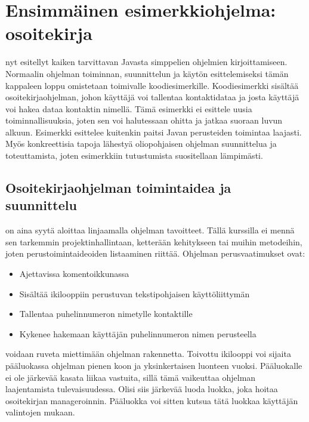 \documentclass{tufte-book}
\begin{document}

\section{Ensimmäinen esimerkkiohjelma: osoitekirja}
\label{osoitekirja}

 nyt esitellyt kaiken tarvittavan Javasta simppelien ohjelmien
kirjoittamiseen. Normaalin ohjelman toiminnan, suunnittelun ja käytön esittelemiseksi tämän
kappaleen loppu omistetaan toimivalle koodiesimerkille. Koodiesimerkki sisältää
osoitekirjaohjelman, johon käyttäjä voi tallentaa kontaktidataa ja josta käyttäjä voi hakea dataa
kontaktin nimellä. Tämä esimerkki ei esittele uusia toiminnallisuuksia, joten sen voi halutessaan
ohitta ja jatkaa suoraan luvun  alkuun. Esimerkki esittelee kuitenkin paitsi
Javan perusteiden toimintaa laajasti. Myös konkreettisia tapoja lähestyä oliopohjaisen ohjelman
suunnittelua ja toteuttamista, joten esimerkkiin tutustumista suositellaan lämpimästi.

\subsection{Osoitekirjaohjelman toimintaidea ja suunnittelu}
\label{osoitekirja suunnittelu}

 on aina syytä aloittaa linjaamalla ohjelman tavoitteet. Tällä
kurssilla ei mennä sen tarkemmin projektinhallintaan, ketterään kehitykseen tai muihin metodeihin,
joten perustoimintaideoiden listaaminen riittää. Ohjelman perusvaatimukset ovat:

\begin{itemize}
	\item Ajettavissa komentoikkunassa
	\item Sisältää ikilooppiin perustuvan tekstipohjaisen käyttöliittymän
	\item Tallentaa puhelinnumeron nimetylle kontaktille
	\item Kykenee hakemaan käyttäjän puhelinnumeron nimen perusteella
\end{itemize}

 voidaan ruveta miettimään ohjelman rakennetta. Toivottu ikilooppi
voi sijaita pääluokassa ohjelman pienen koon ja yksinkertaisen luonteen vuoksi. Pääluokalle ei ole
järkevää kasata liikaa vastuita, sillä tämä vaikeuttaa ohjelman laajentamista tulevaisuudessa.
Olisi siis järkevää luoda luokka, joka hoitaa osoitekirjan manageroinnin. Pääluokka voi sitten
kutsua tätä luokkaa käyttäjän valintojen mukaan.
\end{document}
